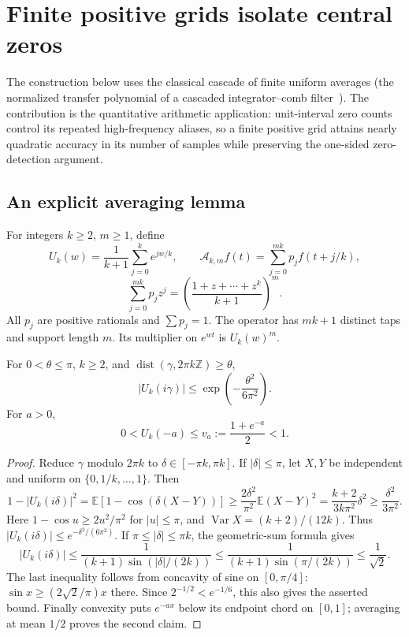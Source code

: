 \section{Finite positive grids isolate central zeros}
\label{grid:sec:main}

The construction below uses the classical cascade of finite uniform averages
(the normalized transfer polynomial of a cascaded integrator--comb filter~\cite{Hogenauer1981}).
The contribution is the quantitative arithmetic application: unit-interval
zero counts control its repeated high-frequency aliases, so a finite positive
grid attains nearly quadratic accuracy in its number of samples while
preserving the one-sided zero-detection argument.

\subsection{An explicit averaging lemma}

For integers $k\ge2$, $m\ge1$, define
\[
 U_k(w)=\frac1{k+1}\sum_{j=0}^{k}e^{jw/k},\qquad
 \mathcal A_{k,m}f(t)=\sum_{j=0}^{mk}p_j f(t+j/k),
\]
\[
 \sum_{j=0}^{mk}p_jz^j=\left(\frac{1+z+\cdots+z^k}{k+1}\right)^m.
\]
All $p_j$ are positive rationals and $\sum p_j=1$. The operator has $mk+1$
distinct taps and support length $m$. Its multiplier on $e^{wt}$ is $U_k(w)^m$.

\begin{lemma}\label{grid:lem:contraction}
For $0<\theta\le\pi$, $k\ge2$, and
$\operatorname{dist}(\gamma,2\pi k\mathbb Z)\ge\theta$,
\[
 |U_k(i\gamma)|\le\exp\left(-\frac{\theta^2}{6\pi^2}\right).
\]
For $a>0$,
\[
 0<U_k(-a)\le v_a:=\frac{1+e^{-a}}2<1.
\]
\end{lemma}
\begin{proof}
Reduce $\gamma$ modulo $2\pi k$ to $\delta\in[-\pi k,\pi k]$.
If $|\delta|\le\pi$, let $X,Y$ be independent and uniform on
$\{0,1/k,\ldots,1\}$. Then
\[
 1-|U_k(i\delta)|^2
 =\mathbb E[1-\cos(\delta(X-Y))]
 \ge\frac{2\delta^2}{\pi^2}\mathbb E(X-Y)^2
 =\frac{k+2}{3k\pi^2}\delta^2\ge\frac{\delta^2}{3\pi^2}.
\]
Here $1-\cos u\ge2u^2/\pi^2$ for $|u|\le\pi$, and
$\operatorname{Var}X=(k+2)/(12k)$. Thus
$|U_k(i\delta)|\le e^{-\delta^2/(6\pi^2)}$.
If $\pi\le|\delta|\le\pi k$, the geometric-sum formula gives
\[
 |U_k(i\delta)|\le\frac1{(k+1)\sin(|\delta|/(2k))}
 \le\frac1{(k+1)\sin(\pi/(2k))}\le\frac1{\sqrt2}.
\]
The last inequality follows from concavity of sine on $[0,\pi/4]$:
$\sin x\ge(2\sqrt2/\pi)x$ there. Since $2^{-1/2}<e^{-1/6}$,
this also gives the asserted bound. Finally convexity puts $e^{-ax}$ below
its endpoint chord on $[0,1]$; averaging at mean $1/2$ proves the second claim.
\end{proof}

